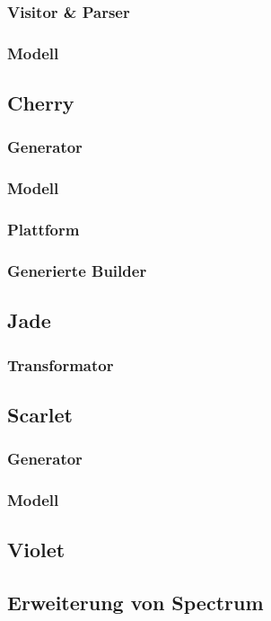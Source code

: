 \documentclass[12pt,oneside,a4paper,parskip]{scrbook}
\begin{document}
\subsubsection{Visitor \& Parser}

\subsubsection{Modell}
\subsection{Cherry}
\subsubsection{Generator}
\subsubsection{Modell}
\subsubsection{Plattform}
\subsubsection{Generierte Builder}
\subsection{Jade}
\subsubsection{Transformator}
\subsection{Scarlet}
\subsubsection{Generator}
\subsubsection{Modell}
\subsection{Violet}
\subsection{Erweiterung von Spectrum}
\end{document}
